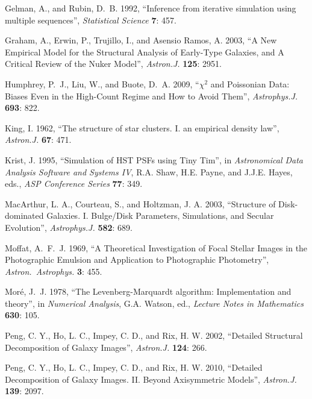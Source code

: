 \documentclass[10pt,a4paper,article]{memoir}
\begin{document}
\begin{thebibliography}{}
 Gelman, A., and Rubin,
D.~B. 1992, ``Inference from iterative simulation using multiple
sequences'', \textit{Statistical Science} \textbf{7}: 457.

 Graham, A., Erwin, P., Trujillo, I., and
Asensio Ramos, A. 2003, ``A New Empirical Model for the Structural Analysis of
Early-Type Galaxies, and A Critical Review of the Nuker Model'',
\textit{Astron.J.} \textbf{125}: 2951.

 Humphrey, P.~J.,
Liu, W., and Buote, D.~A. 2009, ``{$\chi$}$^{2}$ and Poissonian Data:
Biases Even in the High-Count Regime and How to Avoid Them'',
\textit{Astrophys.J.} \textbf{693}: 822.

 King, I. 1962, ``The structure of star
clusters. I. an empirical density law'', \textit{Astron.J.} \textbf{67}:
471.

 Krist, J. 1995, ``Simulation of HST PSFs using
Tiny Tim'', in \textit{Astronomical Data Analysis Software and Systems IV}, R.A.
Shaw, H.E. Payne, and J.J.E. Hayes, eds., \textit{ASP Conference Series}
\textbf{77}: 349.

 MacArthur, L. A.,
Courteau, S., and Holtzman, J. A. 2003, ``Structure of Disk-dominated Galaxies.
I. Bulge/Disk Parameters, Simulations, and Secular Evolution'',
\textit{Astrophys.J.} \textbf{582}: 689.

 Moffat, A.~F.~J. 1969, ``A Theoretical
Investigation of Focal Stellar Images in the Photographic Emulsion and
Application to Photographic Photometry'', \textit{Astron.\ Astrophys.} \textbf{3}: 455.

 Mor{\'e}, J.~J. 1978, ``The
Levenberg-Marquardt algorithm: Implementation and theory'', in
\textit{Numerical Analysis}, G.A. Watson, ed., \textit{Lecture Notes in
Mathematics} \textbf{630}: 105.

 Peng, C. Y., Ho, L. C., Impey, C. D., and
Rix, H. W. 2002, ``Detailed Structural Decomposition of Galaxy Images'',
\textit{Astron.J.} \textbf{124}: 266.

 Peng, C. Y., Ho, L. C., Impey, C. D., and
Rix, H. W. 2010, ``Detailed Decomposition of Galaxy Images. II. Beyond
Axisymmetric Models'', \textit{Astron.J.} \textbf{139}: 2097.


\end{thebibliography}
\end{document}
